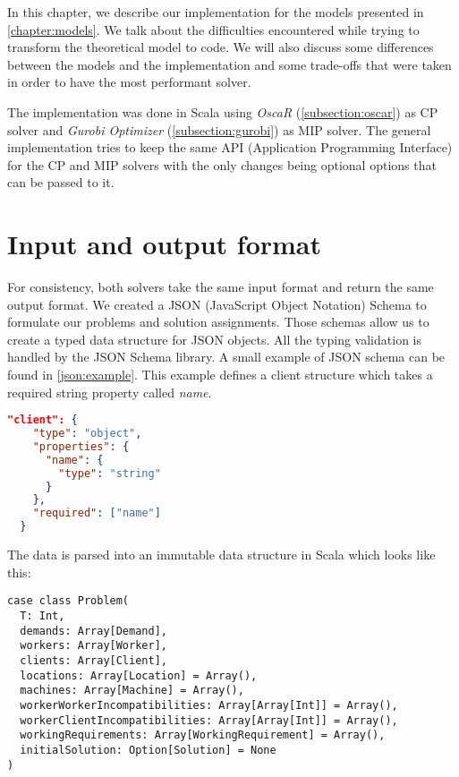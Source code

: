 \documentclass[../thesis.tex]{subfiles}
\begin{document}
In this chapter, we describe our implementation for the models presented in \autoref{chapter:models}. 
We talk about the difficulties encountered while trying to transform the theoretical model to code. 
We will also discuss some differences between the models and the implementation and some trade-offs that were taken in order to 
have the most performant solver.

The implementation was done in Scala using 
\emph{OscaR} (\ref{subsection:oscar}) as CP solver and
\emph{Gurobi Optimizer} (\ref{subsection:gurobi}) as MIP solver. The general implementation 
tries to keep the same API (Application Programming Interface) for the CP and MIP solvers with the only changes being optional options 
that can be passed to it. 



\section{Input and output format}

For consistency, both solvers take the same input format and return the same output format.
We created a JSON (JavaScript Object Notation) Schema \cite{json:schema} to formulate our problems and solution assignments.
Those schemas allow us to create a typed data structure for JSON objects. All the typing validation 
is handled by the JSON Schema library. A small example of JSON schema can be found in \autoref{json:example}. 
This example defines a client structure which takes a required string property called \textit{name}.


\begin{lstlisting}[language=json,firstnumber=1,caption={JSON Schema example},captionpos=b,label={json:example}]
  "client": {
    "type": "object",
    "properties": {
      "name": {
        "type": "string"
      }
    },
    "required": ["name"]
  }
\end{lstlisting}

The data is parsed into an immutable data structure in Scala which looks like this:

\begin{lstlisting}[style=scalaStyle,caption={Problem structure in Scala},captionpos=b]
case class Problem(
  T: Int,
  demands: Array[Demand],
  workers: Array[Worker],
  clients: Array[Client],
  locations: Array[Location] = Array(),
  machines: Array[Machine] = Array(),
  workerWorkerIncompatibilities: Array[Array[Int]] = Array(),
  workerClientIncompatibilities: Array[Array[Int]] = Array(),
  workingRequirements: Array[WorkingRequirement] = Array(),
  initialSolution: Option[Solution] = None
)
\end{lstlisting}
\end{document}

